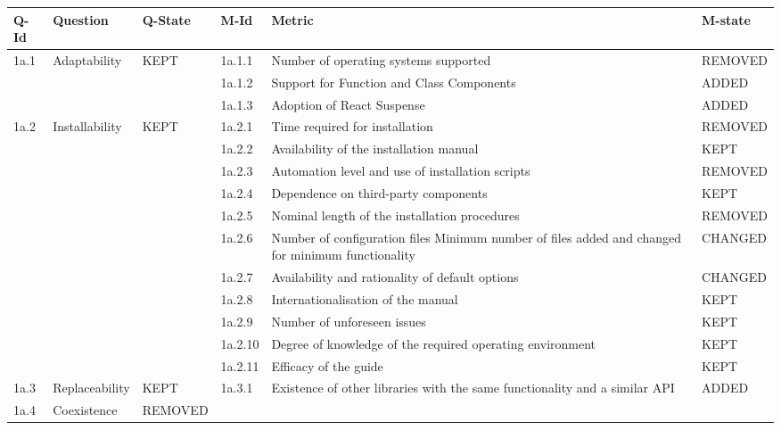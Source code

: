 \begin{tabular}[]{|p{1cm}p{2cm}p{1.5cm}p{1.5cm}p{5cm}p{2.5cm}|}

Q-Id & Question & Q-State & M-Id & Metric & M-state \\
\hline
    \hline
1a.1 & Adaptability & KEPT & 1a.1.1 & Number of operating systems
supported & REMOVED \\
& & & 1a.1.2 & Support for Function and Class Components & ADDED \\
& & & 1a.1.3 & Adoption of React Suspense & ADDED \\
1a.2 & Installability & KEPT & 1a.2.1 & Time required for installation &
REMOVED \\
& & & 1a.2.2 & Availability of the installation manual & KEPT \\
& & & 1a.2.3 & Automation level and use of installation scripts &
REMOVED \\
& & & 1a.2.4 & Dependence on third-party components & KEPT \\
& & & 1a.2.5 & Nominal length of the installation procedures &
REMOVED \\
& & & 1a.2.6 & Number of configuration files Minimum number of files
added and changed for minimum functionality & CHANGED \\
& & & 1a.2.7 & Availability and rationality of default options &
CHANGED \\
& & & 1a.2.8 & Internationalisation of the manual & KEPT \\
& & & 1a.2.9 & Number of unforeseen issues & KEPT \\
& & & 1a.2.10 & Degree of knowledge of the required operating
environment & KEPT \\
& & & 1a.2.11 & Efficacy of the guide & KEPT \\
1a.3 & Replaceability & KEPT & 1a.3.1 & Existence of other libraries
with the same functionality and a similar API & ADDED \\
1a.4 & Coexistence & REMOVED & & & \\
\end{tabular}
